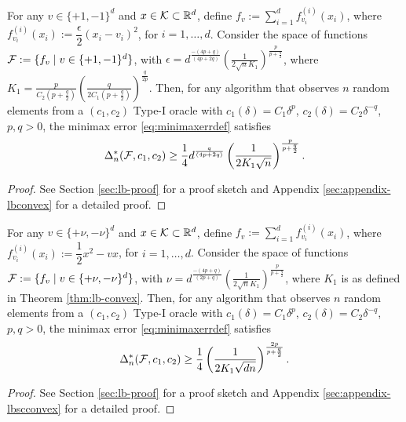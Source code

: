 \begin{theorem}
\label{thm:lb-convex}
For any $v \in \{+1,-1\}^d$ and $x \in \mathcal{K}\subset \mathbb{R}^d$, define $f_v := \sum_{i=1}^d f^{(i)}_{v_i}(x_i)$, where
$f^{(i)}_{v_i}(x_i) := \dfrac{\epsilon}{2} (x_i - v_i)^2$, for $i=1,\ldots,d$.
Consider the space of functions $\mathcal{F}:= \{f_v \mid v  \in \{+1,-1\}^d\}$, with $\epsilon = d^{\frac{-(4p+q)}{(4p+2q)}}\left(\frac{1}{2\sqrt{n} K_1} \right)^{\frac{p}{p+\frac{q}{2}}}$, where \\$K_1 = \frac{p}{C_2(p+\tfrac{q}{2})} \left(\frac{q}{2C_1(p+\tfrac{q}{2})}\right)^{\frac{q}{2p}}$. 
Then, for any algorithm that observes $n$ random elements from a $(c_1,c_2)$ Type-I oracle 
 with $c_1(\delta) = C_1 \delta^p$, $c_2(\delta) = C_2 \delta^{-q}$, $p,q>0$,
 the minimax error \eqref{eq:minimaxerrdef} satisfies
\[
\Delta_n^{*}(\mathcal{F}, c_1,c_2) \ge \dfrac{1}{4}d^{\frac{q}{(4p+2q)}}\left(\dfrac{1}{2 K_1 \sqrt n}\right)^{\frac{p}{p+\frac{q}{2}}}.
\]
\end{theorem}
\begin{proof}
 See Section \ref{sec:lb-proof} for a proof sketch and Appendix \ref{sec:appendix-lbconvex} for a detailed proof.
\end{proof}

\begin{theorem}
\label{thm:lb-strongly-convex}
For any $v \in \{+\nu,-\nu\}^d$ and $x \in \mathcal{K}\subset \mathbb{R}^d$, define $f_v := \sum_{i=1}^d f^{(i)}_{v_i}(x_i)$, where
$f^{(i)}_{v_i}(x_i) := \dfrac{1}{2} x^2 - v x$, for $i=1,\ldots,d$.
Consider the space of functions $\mathcal{F}:= \{f_v \mid v  \in \{+\nu,-\nu\}^d\}$, with $\nu = d^{\frac{-(4p+q)}{(2p+q)}}\left(\frac{1}{2\sqrt{n} K_1} \right)^{\frac{p}{p+\frac{q}{2}}}$, where $K_1$ is as defined in Theorem \ref{thm:lb-convex}. 
Then, for any algorithm that observes $n$ random elements from a $(c_1,c_2)$ Type-I oracle 
 with $c_1(\delta) = C_1 \delta^p$, $c_2(\delta) = C_2 \delta^{-q}$, $p,q>0$,
 the minimax error \eqref{eq:minimaxerrdef} satisfies
\[
\Delta_n^{*}(\mathcal{F}, c_1,c_2) \ge \dfrac{1}{4}  \left(\dfrac{1}{2 K_1 \sqrt {d n}}\right)^{\frac{2p}{p+\frac{q}{2}}}.
\]
\end{theorem}
\begin{proof}
 See Section \ref{sec:lb-proof} for a proof sketch and Appendix \ref{sec:appendix-lbscconvex} for a detailed proof.
\end{proof}





